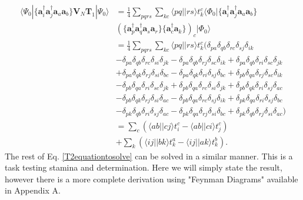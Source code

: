 \documentclass[a4paper,norsk,11pt,twoside]{report}
\begin{document}
\begin{align}
\langle \Psi_{0} | \{\textbf{a}^{\dag}_i \textbf{a}^{\dag}_j \textbf{a}_a \textbf{a}_b\}  \textbf{V}_N \textbf{T}_1 | \Psi_0 \rangle & = 
\frac{1}{4}
\sum_{pqrs}
\sum_{kc}
\langle pq|| rs \rangle t_k^c \langle \Phi_0 | \{
\textbf{a}^{\dag}_i
\textbf{a}^{\dag}_j
\textbf{a}_a
\textbf{a}_b \} \nonumber \\ & 
\left(
\{
\textbf{a}^{\dag}_p
\textbf{a}^{\dag}_q
\textbf{a}_s
\textbf{a}_r
\}
\{
\textbf{a}^{\dag}_c
\textbf{a}_k
\}
\right)_c | \Phi_0 \rangle
\nonumber \\ & = 
\frac{1}{4} \sum_{pqrs} \sum_{kc} \langle pq||rs\rangle t_k^c ( \delta_{pa} \delta_{qb} \delta_{rc} \delta_{sj} \delta_{ik}  \nonumber \\ & 
- \delta_{pa} \delta_{qb} \delta_{rc} \delta_{si} \delta_{jk}
- \delta_{pa} \delta_{qb} \delta_{rj} \delta_{sc} \delta_{ik}
+ \delta_{pa} \delta_{qb} \delta_{ri} \delta_{sc} \delta_{jk}
\nonumber \\ & 
+ \delta_{pa} \delta_{qk} \delta_{rj} \delta_{si} \delta_{bc}
- \delta_{pa} \delta_{qk} \delta_{ri} \delta_{sj} \delta_{bc}
+ \delta_{pb} \delta_{qa} \delta_{rj} \delta_{sc} \delta_{ik}
 \nonumber \\ & 
- \delta_{pb} \delta_{qa} \delta_{ri} \delta_{sc} \delta_{jk}
+ \delta_{pb} \delta_{qa} \delta_{rc} \delta_{si} \delta_{jk} 
+ \delta_{pb} \delta_{qk} \delta_{ri} \delta_{sj} \delta_{ac} \nonumber \\ & 
- \delta_{pb} \delta_{qk} \delta_{rj} \delta_{si} \delta_{ac}
- \delta_{pb} \delta_{qa} \delta_{rc} \delta_{sj} \delta_{ik}
+ \delta_{pk} \delta_{qa} \delta_{ri} \delta_{sj} \delta_{bc} \nonumber \\ & 
- \delta_{pk} \delta_{qb} \delta_{ri} \delta_{sj} \delta_{ac}
- \delta_{pk} \delta_{qa} \delta_{rj} \delta_{si} \delta_{bc}
+ \delta_{pk} \delta_{qb} \delta_{rj} \delta_{si} \delta_{ac}) \nonumber \\ &
= \sum_c \left( \langle ab || cj \rangle t_i^c - \langle ab || ci \rangle t_j^c \right) \nonumber \\ & 
+ \sum_k \left( \langle ij || bk \rangle t_k^a - \langle ij||ak\rangle t_k^b \right) .
\end{align}
The rest of Eq. \eqref{T2equationtosolve} can be solved in a similar manner. This is a task testing stamina and determination. Here we will simply state the result, however there is a more complete derivation using "Feynman Diagrams" available in Appendix A. \\
\end{document}
